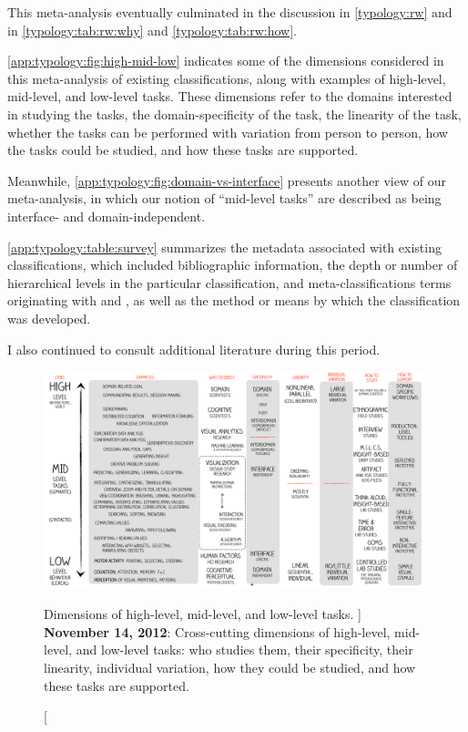 This meta-analysis eventually culminated in the discussion in \autoref{typology:rw} and in \autoref{typology:tab:rw:why} and \autoref{typology:tab:rw:how}.

\autoref{app:typology:fig:high-mid-low} indicates some of the dimensions considered in this meta-analysis of existing classifications, along with examples of high-level, mid-level, and low-level tasks.
These dimensions refer to the domains interested in studying the tasks, the domain-specificity of the task, the linearity of the task, whether the tasks can be performed with variation from person to person, how the tasks could be studied, and how these tasks are supported.

Meanwhile, \autoref{app:typology:fig:domain-vs-interface} presents another view of our meta-analysis, in which our notion of ``mid-level tasks'' are described as being interface- and domain-independent.

\autoref{app:typology:table:survey} summarizes the metadata associated with existing classifications, which included bibliographic information, the depth or number of hierarchical levels in the particular classification, and meta-classifications terms originating with \citet{Roth2012a} and \citet{Chuah1996}, as well as the method or means by which the classification was developed.

I also continued to consult additional literature during this period.


\begin{figure}
	\centering
	\includegraphics[width=\textwidth]{figures/typology-high-mid-low.pdf}
	\caption
	[
	    Dimensions of high-level, mid-level, and low-level tasks.
	]
	{
	    {\bf November 14, 2012}: Cross-cutting dimensions of high-level, mid-level, and low-level tasks: who studies them, their specificity, their linearity, individual variation, how they could be studied, and how these tasks are supported.
	}
	\centering
	\label{app:typology:fig:high-mid-low}
\end{figure}

